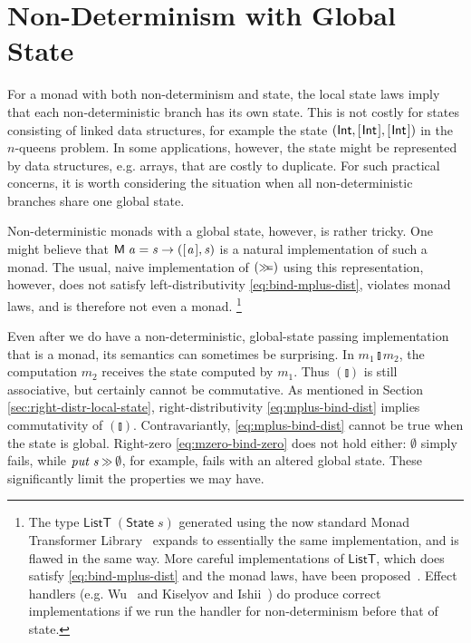 \documentclass{llncs}
\newcommand{\Conid}[1]{\mathit{#1}}
\newcommand{\Varid}[1]{\mathit{#1}}
\let\Varid\mathit
\let\Conid\mathsf
\begin{document}
\section{Non-Determinism with Global State}
\label{sec:nd-state-global}

For a monad with both non-determinism and state, the local state laws imply that each non-deterministic branch has its own state. This is not costly for states consisting of linked data structures, for example the state \ensuremath{(\Conid{Int},[\mskip1.5mu \Conid{Int}\mskip1.5mu],[\mskip1.5mu \Conid{Int}\mskip1.5mu])} in the \ensuremath{\Varid{n}}-queens problem. In some applications, however, the state might be represented by data structures, e.g. arrays, that are costly to duplicate. For such practical concerns, it is worth considering the situation when all non-deterministic branches share one global state.

Non-deterministic monads with a global state, however, is rather tricky.
One might believe that \ensuremath{\Conid{M}\;\Varid{a}\mathrel{=}\Varid{s}\to ([\mskip1.5mu \Varid{a}\mskip1.5mu],\Varid{s})} is a natural implementation of such a monad.
The usual, naive implementation of \ensuremath{(\mathrel{\hstretch{0.7}{>\!\!>\!\!=}})} using this representation, however, does not satisfy left-distributivity \eqref{eq:bind-mplus-dist}, violates monad laws, and is therefore not even a monad.
\footnote{
The type \ensuremath{\Conid{ListT}\;(\Conid{State}\;\Varid{s})} generated using the now standard Monad Transformer Library~\cite{MTL:14} expands to essentially the same implementation, and is flawed in the same way.
More careful implementations of \ensuremath{\Conid{ListT}}, which does satisfy \eqref{eq:bind-mplus-dist} and the monad laws, have been proposed~\cite{Gale:07:ListT, Volkov:14:list-t}.
Effect handlers (e.g. Wu~\cite{Wu:14:Effect} and Kiselyov and Ishii~\cite{KiselyovIshii:15:Freer}) do produce correct implementations if we run the handler for non-determinism before that of state.
}

Even after we do have a non-deterministic, global-state passing implementation that is a monad, its semantics can sometimes be surprising.
In \ensuremath{\Varid{m}_{1}\mathbin{\talloblong}\Varid{m}_{2}}, the computation \ensuremath{\Varid{m}_{2}} receives the state computed by \ensuremath{\Varid{m}_{1}}.
Thus \ensuremath{(\talloblong)} is still associative, but certainly cannot be commutative.
As mentioned in Section \ref{sec:right-distr-local-state}, right-distributivity \eqref{eq:mplus-bind-dist} implies commutativity of \ensuremath{(\talloblong)}.
Contravariantly, \eqref{eq:mplus-bind-dist} cannot be true when the state is global.
Right-zero \eqref{eq:mzero-bind-zero} does not hold either: \ensuremath{\emptyset} simply fails, while \ensuremath{\Varid{put}\;\Varid{s}\mathbin{\hstretch{0.7}{>\!\!>}}\emptyset}, for example, fails with an altered global state.
These significantly limit the properties we may have.
\end{document}
